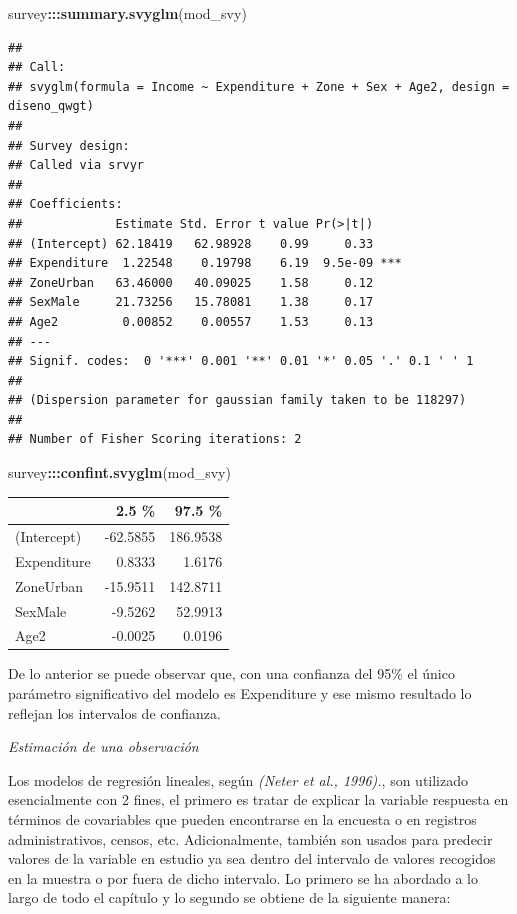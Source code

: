 \documentclass[
  spanish,
  12pt,
]{book}
\newenvironment{Shaded}{\begin{snugshade}}{\end{snugshade}}
\newcommand{\FunctionTok}[1]{\textcolor[rgb]{0.13,0.29,0.53}{\textbf{#1}}}
\newcommand{\NormalTok}[1]{#1}
\newcommand{\SpecialCharTok}[1]{\textcolor[rgb]{0.81,0.36,0.00}{\textbf{#1}}}
\begin{document}
\begin{Shaded}
\begin{Highlighting}[]
\NormalTok{survey}\SpecialCharTok{:::}\FunctionTok{summary.svyglm}\NormalTok{(mod\_svy)}
\end{Highlighting}
\end{Shaded}

\begin{verbatim}
## 
## Call:
## svyglm(formula = Income ~ Expenditure + Zone + Sex + Age2, design = diseno_qwgt)
## 
## Survey design:
## Called via srvyr
## 
## Coefficients:
##             Estimate Std. Error t value Pr(>|t|)    
## (Intercept) 62.18419   62.98928    0.99     0.33    
## Expenditure  1.22548    0.19798    6.19  9.5e-09 ***
## ZoneUrban   63.46000   40.09025    1.58     0.12    
## SexMale     21.73256   15.78081    1.38     0.17    
## Age2         0.00852    0.00557    1.53     0.13    
## ---
## Signif. codes:  0 '***' 0.001 '**' 0.01 '*' 0.05 '.' 0.1 ' ' 1
## 
## (Dispersion parameter for gaussian family taken to be 118297)
## 
## Number of Fisher Scoring iterations: 2
\end{verbatim}

\begin{Shaded}
\begin{Highlighting}[]
\NormalTok{survey}\SpecialCharTok{:::}\FunctionTok{confint.svyglm}\NormalTok{(mod\_svy)}
\end{Highlighting}
\end{Shaded}

\begin{tabular}{l|r|r}
\hline
  & 2.5 \% & 97.5 \%\\
\hline
(Intercept) & -62.5855 & 186.9538\\
\hline
Expenditure & 0.8333 & 1.6176\\
\hline
ZoneUrban & -15.9511 & 142.8711\\
\hline
SexMale & -9.5262 & 52.9913\\
\hline
Age2 & -0.0025 & 0.0196\\
\hline
\end{tabular}

De lo anterior se puede observar que, con una confianza del 95\% el único parámetro significativo del modelo es Expenditure y ese mismo resultado lo reflejan los intervalos de confianza.

\emph{Estimación de una observación}

Los modelos de regresión lineales, según \emph{(Neter et al., 1996).}, son utilizado esencialmente con 2 fines, el primero es tratar de explicar la variable respuesta en términos de covariables que pueden encontrarse en la encuesta o en registros administrativos, censos, etc. Adicionalmente, también son usados para predecir valores de la variable en estudio ya sea dentro del intervalo de valores recogidos en la muestra o por fuera de dicho intervalo. Lo primero se ha abordado a lo largo de todo el capítulo y lo segundo se obtiene de la siguiente manera:
\end{document}

